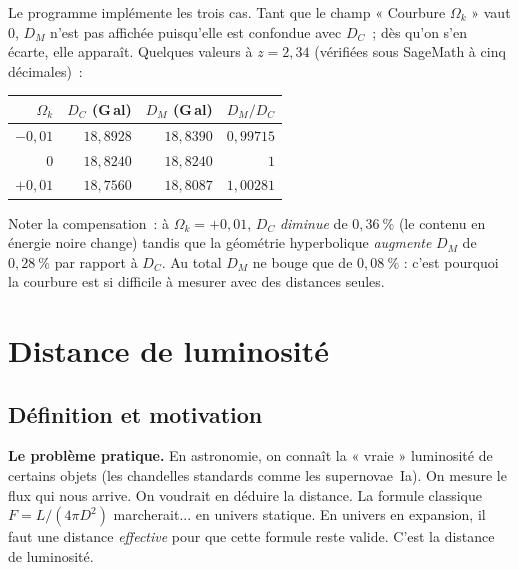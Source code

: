 \documentclass[11pt,a4paper,openany]{report}
\newcommand{\Ok}{\Omega_{k}}
\begin{document}
\begin{tcolorbox}[gui]
Le programme implémente les trois cas. Tant que le champ « Courbure $\Ok$ »
vaut 0, $D_{M}$ n'est pas affichée puisqu'elle est confondue avec $D_{C}$~;
dès qu'on s'en écarte, elle apparaît. Quelques valeurs à $z = 2{,}34$
(vérifiées sous SageMath à cinq décimales)~:

\medskip
\begin{center}
\begin{tabular}{rrrr}
\toprule
$\Ok$ & $D_{C}$ (G\,al) & $D_{M}$ (G\,al) & $D_{M}/D_{C}$ \\
\midrule
$-0{,}01$ & $18{,}8928$ & $18{,}8390$ & $0{,}99715$ \\
$0$       & $18{,}8240$ & $18{,}8240$ & $1$ \\
$+0{,}01$ & $18{,}7560$ & $18{,}8087$ & $1{,}00281$ \\
\bottomrule
\end{tabular}
\end{center}

\medskip
Noter la compensation~: à $\Ok = +0{,}01$, $D_{C}$ \emph{diminue} de
$0{,}36~\%$ (le contenu en énergie noire change) tandis que la géométrie
hyperbolique \emph{augmente} $D_M$ de $0{,}28~\%$ par rapport à $D_C$. Au
total $D_{M}$ ne bouge que de $0{,}08~\%$ : c'est pourquoi la courbure est si
difficile à mesurer avec des distances seules.
\end{tcolorbox}

\chapter{Distance de luminosité}
\label{chap:DL}

\section{Définition et motivation}

\begin{tcolorbox}[vulgarisation]
\textbf{Le problème pratique.} En astronomie, on connaît la « vraie » luminosité
de certains objets (les chandelles standards comme les supernovae~Ia). On mesure
le flux qui nous arrive. On voudrait en déduire la distance. La formule
classique $F = L/(4\pi D^{2})$ marcherait... en univers statique. En univers en
expansion, il faut une distance \emph{effective} pour que cette formule reste
valide. C'est la distance de luminosité.
\end{tcolorbox}
\end{document}
